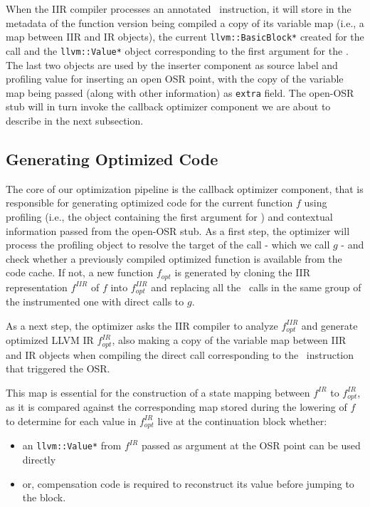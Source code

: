 When the IIR compiler processes an annotated \feval\ instruction, it will store in the metadata of the function version being compiled a copy of its variable map (i.e., a map between IIR and IR objects), the current {\tt llvm::BasicBlock*} created for the call and the {\tt llvm::Value*} object corresponding to the first argument for the \feval. The last two objects are used by the inserter component as source label and profiling value for inserting an open OSR point, with the copy of the variable map being passed (along with other information) as {\tt extra} field. The open-OSR stub will in turn invoke the callback optimizer component we are about to describe in the next subsection.

\subsection{Generating Optimized Code}
The core of our optimization pipeline is the callback optimizer component, that is responsible for generating optimized code for the current function $f$ using profiling (i.e., the object containing the first argument for \feval) and contextual information passed from the open-OSR stub. As a first step, the optimizer will process the profiling object to resolve the target of the call - which we call $g$ -  and check whether a previously compiled optimized function is available from the code cache. If not, a new function $f_{opt}$ is generated by cloning the IIR representation $f^{IIR}$ of $f$ into
 $f^{IIR}_{opt}$ and replacing all the \feval\ calls in the same group of the instrumented one with direct calls to $g$.

As a next step, the optimizer asks the IIR compiler to analyze $f^{IIR}_{opt}$ and generate optimized LLVM IR $f^{IR}_{opt}$, also making a copy of the variable map between IIR and IR objects when compiling the direct call corresponding to the \feval\ instruction that triggered the OSR.

This map is essential for the construction of a state mapping between $f^{IR}$ to $f^{IR}_{opt}$, as it is compared against the corresponding map stored during the lowering of $f$ to determine for each value in $f^{IR}_{opt}$ live at the continuation block whether:
\begin{itemize}
\item an {\tt llvm::Value*} from $f^{IR}$ passed as argument at the OSR point can be used directly
\item or, compensation code is required to reconstruct its value before jumping to the block.
\end{itemize}


